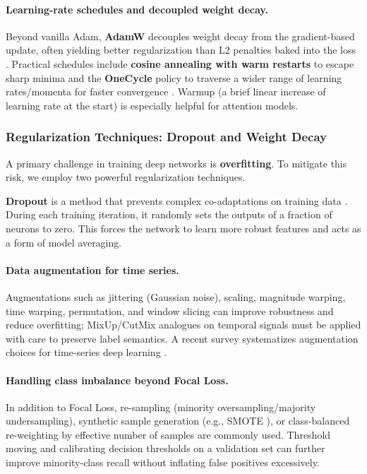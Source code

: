 \paragraph{Learning-rate schedules and decoupled weight decay.} Beyond vanilla Adam, \textbf{AdamW} decouples weight decay from the gradient-based update, often yielding better regularization than L2 penalties baked into the loss \citep{loshchilov2019decoupled}. Practical schedules include \textbf{cosine annealing with warm restarts} to escape sharp minima \citep{loshchilov2016sgdr} and the \textbf{OneCycle} policy to traverse a wider range of learning rates/momenta for faster convergence \citep{smith2018superconvergence}. Warmup (a brief linear increase of learning rate at the start) is especially helpful for attention models.

\subsubsection{Regularization Techniques: Dropout and Weight Decay}
\label{sec:regularization}

A primary challenge in training deep networks is \textbf{overfitting}. To mitigate this risk, we employ two powerful regularization techniques.

\textbf{Dropout} is a method that prevents complex co-adaptations on training data \citep{srivastava2014dropout}. During each training iteration, it randomly sets the outputs of a fraction of neurons to zero. This forces the network to learn more robust features and acts as a form of model averaging.

\paragraph{Data augmentation for time series.} Augmentations such as jittering (Gaussian noise), scaling, magnitude warping, time warping, permutation, and window slicing can improve robustness and reduce overfitting; MixUp/CutMix analogues on temporal signals must be applied with care to preserve label semantics. A recent survey systematizes augmentation choices for time-series deep learning \citep{wen2021time}.

\paragraph{Handling class imbalance beyond Focal Loss.} In addition to Focal Loss, re-sampling (minority oversampling/majority undersampling), synthetic sample generation (e.g., SMOTE \citep{chawla2002smote}), or class-balanced re-weighting by effective number of samples are commonly used. Threshold moving and calibrating decision thresholds on a validation set can further improve minority-class recall without inflating false positives excessively.

